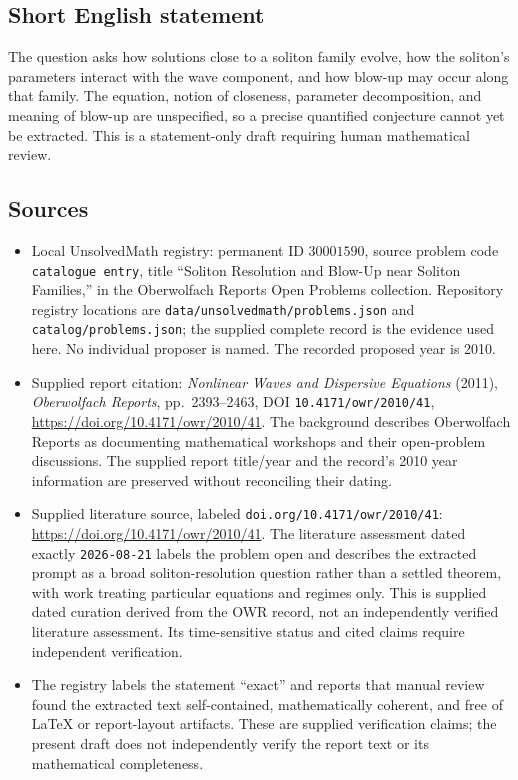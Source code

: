 \documentclass[11pt]{article}
\begin{document}
\subsection{Short English statement}
The question asks how solutions close to a soliton family evolve, how the soliton's parameters interact with the wave component, and how blow-up may occur along that family. The equation, notion of closeness, parameter decomposition, and meaning of blow-up are unspecified, so a precise quantified conjecture cannot yet be extracted. This is a statement-only draft requiring human mathematical review.
\subsection{Sources}
\begin{itemize}
\item Local UnsolvedMath registry: permanent ID \(30001590\), source problem code \texttt{catalogue entry}, title ``Soliton Resolution and Blow-Up near Soliton Families,'' in the Oberwolfach Reports Open Problems collection. Repository registry locations are \texttt{data/unsolvedmath/problems.json} and \texttt{catalog/problems.json}; the supplied complete record is the evidence used here. No individual proposer is named. The recorded proposed year is 2010.
\item Supplied report citation: \emph{Nonlinear Waves and Dispersive Equations} (2011), \emph{Oberwolfach Reports}, pp.\ 2393--2463, DOI \texttt{10.4171/owr/2010/41}, \url{https://doi.org/10.4171/owr/2010/41}. The background describes Oberwolfach Reports as documenting mathematical workshops and their open-problem discussions. The supplied report title/year and the record's 2010 year information are preserved without reconciling their dating.
\item Supplied literature source, labeled \texttt{doi.org/10.4171/owr/2010/41}: \url{https://doi.org/10.4171/owr/2010/41}. The literature assessment dated exactly \texttt{2026-08-21} labels the problem open and describes the extracted prompt as a broad soliton-resolution question rather than a settled theorem, with work treating particular equations and regimes only. This is supplied dated curation derived from the OWR record, not an independently verified literature assessment. Its time-sensitive status and cited claims require independent verification.
\item The registry labels the statement ``exact'' and reports that manual review found the extracted text self-contained, mathematically coherent, and free of LaTeX or report-layout artifacts. These are supplied verification claims; the present draft does not independently verify the report text or its mathematical completeness.
\end{itemize}
\end{document}
